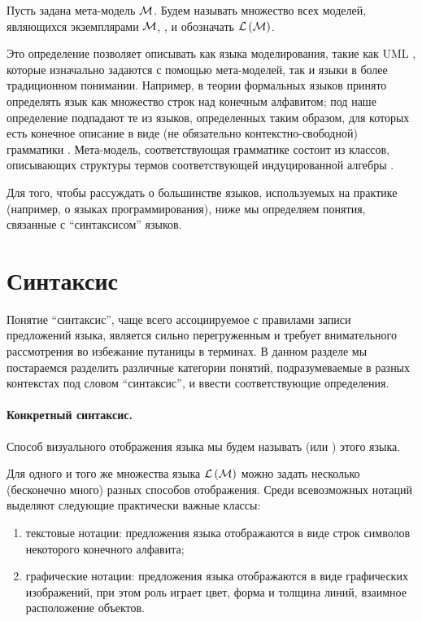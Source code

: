 \begin{Def}
Пусть задана мета-модель $\mathcal{M}$. Будем называть множество всех моделей, являющихся экземплярами $\mathcal{M}$, , и обозначать $\mathcal{L}\left(\mathcal{M}\right)$.
\end{Def}

Это определение позволяет описывать как языка моделирования, такие как UML \cite{???}, которые изначально задаются с помощью мета-моделей, так и языки в более традиционном понимании. Например, в теории формальных языков \cite{???} принято определять язык как множество строк над конечным алфавитом; под наше определение подпадают те из языков, определенных таким образом, для которых есть конечное описание в виде (не обязательно контекстно-свободной) грамматики \cite{???}. Мета-модель, соответствующая грамматике состоит из классов, описывающих структуры термов соответствующей индуцированной алгебры \cite{???}.

Для того, чтобы рассуждать о большинстве языков, используемых на практике (например, о языках программирования), ниже мы определяем понятия, связанные с ``синтаксисом'' языков.

\section{Синтаксис}

Понятие ``синтаксис'', чаще всего ассоциируемое с правилами записи предложений языка, является сильно перегруженным и требует внимательного рассмотрения во избежание путаницы в терминах. В данном разделе мы постараемся разделить различные категории понятий, подразумеваемые в разных контекстах под словом ``синтаксис'', и ввести соответствующие определения.

\paragraph*{Конкретный синтаксис. } Способ визуального отображения языка мы будем называть  (или ) этого языка.

Для одного и того же множества языка $\mathcal{L}\left(\mathcal{M}\right)$ можно задать несколько (бесконечно много) разных способов отображения. Среди всевозможных нотаций выделяют следующие практически важные классы:
\begin{enumerate}
\item текстовые нотации: предложения языка отображаются в виде строк символов некоторого конечного алфавита;
\item графические нотации: предложения языка отображаются в виде графических изображений, при этом роль играет цвет, форма и толщина линий, взаимное расположение объектов.
\end{enumerate}

